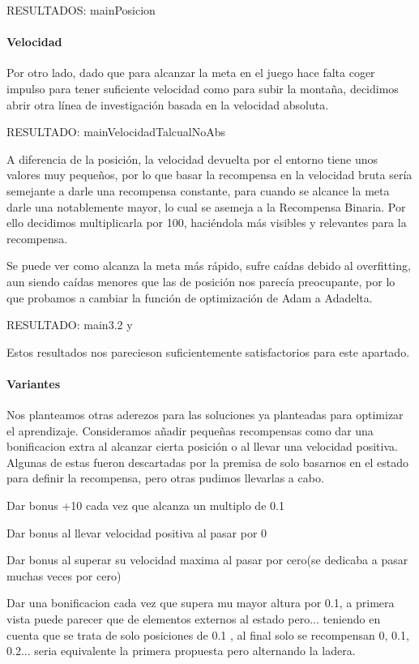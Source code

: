 RESULTADOS: mainPosicion

\paragraph{Velocidad}
Por otro lado, dado que para alcanzar la meta en el juego hace falta coger impulso para tener suficiente velocidad como para subir la montaña, decidimos abrir otra línea de investigación basada en la velocidad absoluta.

RESULTADO: mainVelocidadTalcualNoAbs

A diferencia de la posición, la velocidad devuelta por el entorno tiene unos valores muy pequeños, por lo que basar la recompensa en la velocidad bruta sería semejante a darle una recompensa constante, para cuando se alcance la meta darle una notablemente mayor, lo cual se asemeja a la Recompensa Binaria. Por ello decidimos multiplicarla por 100, haciéndola más visibles y relevantes para la recompensa. 

Se puede ver como alcanza la meta más rápido, sufre caídas debido al overfitting, aun siendo caídas menores que las de posición nos parecía preocupante, por lo que probamos a cambiar la función de optimización de Adam a Adadelta.

RESULTADO: main3.2 y  

Estos resultados nos parecieson suficientemente satisfactorios para este apartado.

\paragraph{Variantes}
Nos planteamos otras aderezos para las soluciones ya planteadas para optimizar el aprendizaje. 
Consideramos añadir pequeñas recompensas como dar una bonificacion extra al alcanzar cierta posición o al llevar una velocidad positiva.
Algunas de estas fueron descartadas por la premisa de solo basarnos en el estado para definir la recompensa, pero otras pudimos llevarlas a cabo.

 Dar bonus +10 cada vez que alcanza un multiplo de 0.1

 Dar bonus al llevar velocidad positiva al pasar por 0

 Dar bonus al superar su velocidad maxima al pasar por cero(se dedicaba a pasar muchas veces por cero)

 Dar una bonificacion cada vez que supera mu mayor altura por 0.1, a primera vista puede parecer que de elementos externos al estado pero... teniendo en cuenta que se trata de solo posiciones de 0.1 , al final solo se recompensan 0, 0.1, 0.2... seria equivalente la primera propuesta pero alternando la ladera. 



